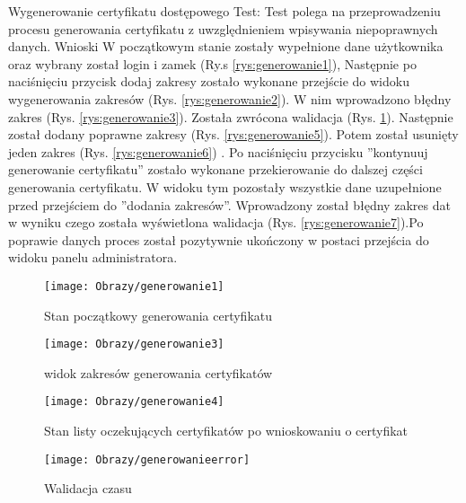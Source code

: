 \begin{enumerate*}
	\newpage
	\item  Wygenerowanie certyfikatu dostępowego\newline
	Test: Test polega na przeprowadzeniu procesu generowania certyfikatu z uwzględnieniem wpisywania niepoprawnych danych.\newline
	Wnioski W początkowym stanie zostały wypełnione dane użytkownika oraz wybrany został login i zamek (Ry.s \ref{rys:generowanie1}), Następnie po naciśnięciu przycisk dodaj zakresy zostało wykonane przejście do widoku  wygenerowania zakresów (Rys. \ref{rys:generowanie2}). W nim wprowadzono  błędny zakres (Rys. \ref{rys:generowanie3}). Została zwrócona walidacja (Rys. \ref{rys:generowanie4}). Następnie został dodany poprawne zakresy (Rys. \ref{rys:generowanie5}). Potem został usunięty jeden zakres (Rys. \ref{rys:generowanie6})   . Po naciśnięciu przycisku ''kontynuuj generowanie certyfikatu'' zostało wykonane przekierowanie  do dalszej części generowania certyfikatu. W widoku tym pozostały wszystkie dane uzupełnione przed przejściem do ''dodania zakresów''. Wprowadzony został błędny zakres dat w wyniku czego została wyświetlona walidacja (Rys. \ref{rys:generowanie7}).Po poprawie danych proces został pozytywnie ukończony w postaci przejścia do widoku panelu administratora.
	
	\begin{figure}[ht!]	
		\centering
		\begin{minipage}{0.2\textwidth}
			\texttt{[image: Obrazy/generowanie1]}
			\caption{Stan początkowy generowania certyfikatu }
			\label{rys:generowanie1}
		\end{minipage}
	\hspace{0.02\textwidth}
		\begin{minipage}{0.2\textwidth}
			\texttt{[image: Obrazy/generowanie3]}
			\caption{widok zakresów generowania certyfikatów}
			\label{rys:generowanie2}
		\end{minipage}
	\hspace{0.02\textwidth}
		\begin{minipage}{0.2\textwidth}
			\vspace{0.35cm}
			\texttt{[image: Obrazy/generowanie4]}
			\caption{Stan listy oczekujących certyfikatów po wnioskowaniu o certyfikat}
			\label{rys:generowanie3}
		\end{minipage}	
	\hspace{0.02\textwidth}
		\begin{minipage}{0.2\textwidth}
			\vspace{-0.4cm}
			\texttt{[image: Obrazy/generowanieerror]}
			\caption{Walidacja czasu }
			\label{rys:generowanie4}
		\end{minipage}
	\end{figure}


\end{enumerate*}

